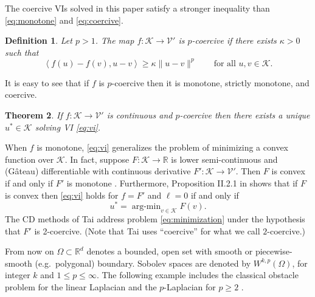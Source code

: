 \documentclass[letterpaper,final,12pt,reqno]{amsart}
\theoremstyle{cstyle}
\newtheorem{theorem}{Theorem}
\theoremstyle{cstyle*}
\theoremstyle{dstyle}
\newtheorem{definition}[theorem]{Definition}
\numberwithin{equation}{section}
\numberwithin{figure}{section}
\numberwithin{table}{section}
\numberwithin{theorem}{section}
\newcommand{\RR}{\mathbb{R}}
\newcommand{\cK}{\mathcal{K}}
\newcommand{\cV}{\mathcal{V}}
\newcommand{\ip}[2]{\left<#1,#2\right>}
\begin{document}
The coercive VIs solved in this paper satisfy a stronger inequality than \eqref{eq:monotone} and \eqref{eq:coercive}.

\begin{definition}  Let $p>1$.  The map $f:\cK \to \cV'$ is \emph{$p$-coercive} if there exists $\kappa>0$ such that
\begin{equation}
\ip{f(u)-f(v)}{u-v} \ge \kappa \|u-v\|^p \qquad \text{for all } u,v \in \cK. \label{eq:pcoercive}
\end{equation}
\end{definition}

It is easy to see that if $f$ is $p$-coercive then it is monotone, strictly monotone, and coercive.

\begin{theorem}  \label{thm:viwellposed}  If $f:\cK \to \cV'$ is continuous and $p$-coercive then there exists a unique $u^*\in \cK$ solving VI \eqref{eq:vi}.
\end{theorem}

When $f$ is monotone, \eqref{eq:vi} generalizes the problem of minimizing a convex function over $\cK$.  In fact, suppose $F:\cK \to \RR$ is lower semi-continuous and (G\^ateau) differentiable with continuous derivative $F':\cK \to \cV'$.  Then $F$ is convex if and only if $F'$ is monotone \cite[Proposition I.5.5]{EkelandTemam1976}.  Furthermore, Proposition II.2.1 in \cite{EkelandTemam1976} shows that if $F$ is convex then \eqref{eq:vi} holds for $f=F'$ and $\ell=0$ if and only if
\begin{equation}
u^* = \operatorname{arg-min}_{v\in\cK} F(v). \label{eq:minimization}
\end{equation}
The CD methods of Tai \cite{Tai2003} address problem \eqref{eq:minimization} under the hypothesis that $F'$ is 2-coercive.  (Note that Tai \cite{Tai2003} uses ``coercive'' for what we call $2$-coercive.)

From now on $\Omega \subset \RR^d$ denotes a bounded, open set with smooth or piecewise-smooth (e.g.~polygonal) boundary.  Sobolev spaces \cite{Evans2010} are denoted by $W^{k,p}(\Omega)$, for integer $k$ and $1\le p \le \infty$.  The following example includes the classical obstacle problem for the linear Laplacian \cite{GraeserKornhuber2009} and the $p$-Laplacian for $p\ge 2$ \cite{ChoeLewis1991}.
\end{document}
